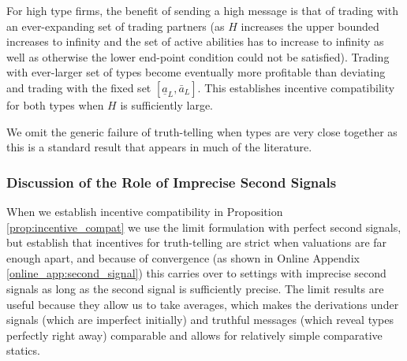 \documentclass[12pt]{article}
\begin{document}
For high type firms, the benefit of sending a high message is that  of trading with an ever-expanding set of trading partners (as $H$ increases the upper bounded increases to infinity and the set of active abilities has to increase to infinity as well as otherwise the lower end-point condition could not be satisfied). Trading with ever-larger set of types become eventually more profitable than deviating and trading with the fixed set $\left[\underline{a}_L,\bar{a}_L\right]$. This establishes incentive compatibility for both types when $H$ is sufficiently large. 

\bigskip

We omit the generic failure of truth-telling when types are very close together as this is a standard result that appears in much of the literature. 






\subsubsection{Discussion of the Role of Imprecise Second Signals}
\label{online_app:imprecise_second_signal} 

When we establish incentive compatibility in Proposition \ref{prop:incentive_compat} we use the limit formulation with perfect second signals, but establish that incentives for truth-telling are strict when valuations are far enough apart, and because of convergence (as shown in Online Appendix \ref{online_app:second_signal}) this carries over to settings with imprecise second signals as long as the second signal is sufficiently precise. The limit results are useful because they allow us to take averages, which makes the derivations under signals (which are imperfect initially) and truthful messages (which reveal types perfectly right away) comparable and allows for relatively simple comparative statics. 
\end{document}
